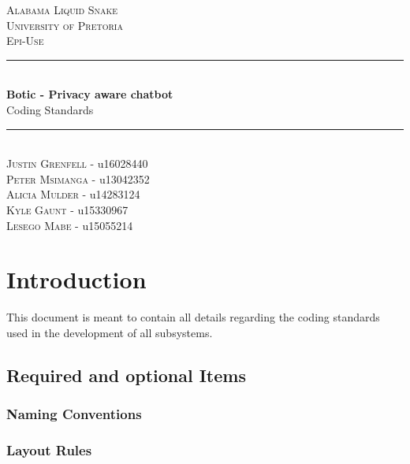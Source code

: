 \documentclass[11pt]{article}
\begin{document}
\renewcommand{\familydefault}{\sfdefault}
\begin{titlepage}
	\newcommand{\HRule}{\rule{\linewidth}{0.5mm}}
	\begin{center}
		            
		\textsc{\LARGE Alabama Liquid Snake}\\[0.8cm]
		\textsc{\Large University of Pretoria}\\[0.5cm]
		\textsc{\large Epi-Use}\\[0.5cm]
		    
		\HRule\\[0.4cm]
		    	
		{\huge\bfseries Botic - Privacy aware chatbot}\\[0.2cm]
		    	
		{\huge Coding Standards}\\[0.2cm]
		
		\HRule\\[0.5cm]
		
		\textsc{Justin Grenfell} - u16028440 \\[0cm]
		\textsc{Peter Msimanga} - u13042352 \\[0cm]
		\textsc{Alicia Mulder} - u14283124 \\[0cm]
		\textsc{Kyle Gaunt} - u15330967 \\[0cm]
		\textsc{Lesego Mabe} - u15055214 \\[0cm]
		    
	\end{center}
\end{titlepage}
\tableofcontents
\newpage
\section{Introduction}

This document is meant to contain all details regarding the coding standards used in the development of all subsystems.

\subsection{Required and optional Items}
\subsubsection{Naming Conventions}
\subsubsection{Layout Rules}
\end{document}
